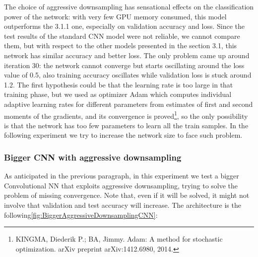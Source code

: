 \noindent The choice of aggressive downsampling has sensational effects on the classification power of the network: with very few GPU memory consumed, this model outperforms the 3.1.1 one, especially on validation accuracy and loss. Since the test results of the standard CNN model were not reliable, we cannot compare them, but with respect to the other models presented in the section 3.1, this network has similar accuracy and better loss. The only problem came up around iteration 30: the network cannot converge but starts oscillating around the loss value of 0.5, also training accuracy oscillates while validation loss is stuck around 1.2.
The first hypothesis could be that the learning rate is too large in that training phase, but we used as optimizer Adam which computes individual adaptive learning rates for different parameters from estimates of first and second moments of the gradients, and its convergence is proved\footnote{KINGMA, Diederik P.; BA, Jimmy. Adam: A method for stochastic optimization. arXiv preprint arXiv:1412.6980, 2014.}, so the only possibility is that the network has too few parameters to learn all the train samples. In the following experiment we try to increase the network size to face such problem.


\subsubsection{Bigger CNN with aggressive downsampling}
As anticipated in the previous paragraph, in this experiment we test a bigger Convolutional NN that exploits aggressive downsampling, trying to solve the problem of missing convergence. Note that, even if it will be solved, it might not involve that validation and test accuracy will increase. The architecture is the following\ref{fig:BiggerAggressiveDownsamplingCNN}:

